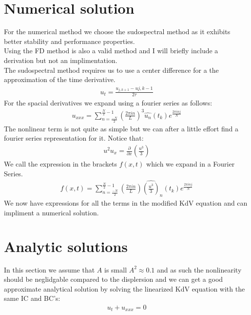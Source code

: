 \documentclass{article}
\begin{document}
\section{Numerical solution}
For the numerical method we choose the sudospectral method as it exhibits better stability and performance properties. \\
Using the FD method is also a valid method and I will briefly include a derivation but not an implimentation. \\
The sudospectral method requires us to use a center difference for a the approximation of the time derivative. 
\begin{align*}
u_t = \frac{u_{j,k+1}-u{j,k-1}}{2\tau}
\end{align*}
For the spacial derivatives we expand using a fourier series as follows:
\begin{align*}
u_{xxx} = \sum_{n=\frac{-N}{2}}^{\frac{N}{2}-1}\left(\frac{2\pi i n}{L}\right)^3 \widehat{u_n}(t_k)e^{\frac{2\pi i n j}{N}}
\end{align*}
The nonlinear term is not quite as simple but we can after a little effort find a fourier series representation for it. Notice that:
\begin{align*}
u^2u_x = \frac{\partial}{\partial x}\left(\frac{u^3}{3}\right)
\end{align*}
We call the expression in the brackets $f(x,t)$ which we expand in a Fourier Series.
\begin{align*}
f(x,t) = \sum_{n=\frac{-N}{2}}^{\frac{N}{2}-1}\left(\frac{2\pi i n}{L}\right) \widehat{\left(\frac{u^3}{3}\right)}_n(t_k)e^{\frac{2\pi i n j}{N}}
\end{align*}
We now have expressions for all the terms in the modified KdV equation and can impliment a numerical solution. 
\section{Analytic solutions}
In this section we assume that $A$ is small $A^2\approx0.1$ and as such the nonlinearity should be neglidgable compared to the displersion and we can get a good approximate analytical solution by solving the linearized KdV equation with the same IC and BC's:
\begin{align*}
u_t + u_{xxx} = 0
\end{align*}
\end{document}
